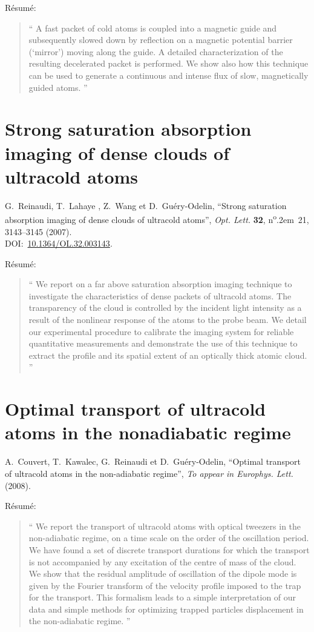 \vspace{1ex}
Résumé:
\begin{quote}\enquote{
A fast packet of cold atoms is coupled into a magnetic guide and subsequently slowed down by reflection on a magnetic potential barrier (`mirror') moving along the guide. A detailed characterization of the resulting decelerated packet is performed. We show also how this technique can be used to generate a continuous and intense flux of slow, magnetically guided atoms.%
}\end{quote}

\section{Strong saturation absorption imaging of dense clouds of ultracold atoms}
\noindent
{\sc G.~{Reinaudi}}, {\sc T.~{Lahaye }}, {\sc Z.~{Wang}} et {\sc
  D.~{Guéry-Odelin}}, \enquote{Strong saturation absorption imaging of dense
  clouds of ultracold atoms}, {\em Opt. Lett.\/} {\bf 32},
  n\textsuperscript{o}\kern.2em\relax~21, 3143--3145 (2007).
\\
  DOI:~\href{http://dx.doi.org/10.1364/OL.32.003143}{10.1364/OL.32.003143}.

\vspace{1ex}
Résumé:
\begin{quote}\enquote{
We report on a far above saturation absorption imaging technique to investigate the characteristics of dense packets of ultracold atoms. The transparency of the cloud is controlled by the incident light intensity as a result of the nonlinear response of the atoms to the probe beam. We detail our experimental procedure to calibrate the imaging system for reliable quantitative measurements and demonstrate the use of this technique to extract the profile and its spatial extent of an optically thick atomic cloud.%
}\end{quote}

\section{Optimal transport of ultracold atoms in the nonadiabatic regime}
\noindent
{\sc A.~{Couvert}}, {\sc T.~{Kawalec}}, {\sc G.~{Reinaudi}} et {\sc
  D.~{Guéry-Odelin}}, \enquote{{Optimal transport of ultracold atoms in the
  non-adiabatic regime}}, {\em To appear in Europhys. Lett.\/} (2008).

\vspace{1ex}
Résumé:
\begin{quote}\enquote{
We report the transport of ultracold atoms with optical tweezers in the non-adiabatic regime, \ie on a time scale on the order of the oscillation period. We have found a set of discrete transport durations for which the transport is not accompanied by any excitation of the centre of mass of the cloud. We show that the residual amplitude of oscillation of the dipole mode is given by the Fourier transform of the velocity profile imposed to the trap for the transport. This formalism leads to a simple interpretation of our data and simple methods for optimizing trapped particles displacement in the non-adiabatic regime.%
}\end{quote}


